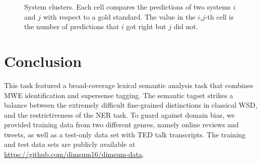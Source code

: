 \documentclass[11pt,letterpaper]{article}
\begin{document}
\begin{figure}
	\caption{System clusters. Each cell compares the predictions of two systems $i$ and $j$ with respect to a gold standard. The value in the $i$,$j$-th cell is the number of predictions that $i$ got right but $j$ did not.}
	\label{fig:system-clusters}
\end{figure}













\section{Conclusion}
This task featured a broad-coverage lexical semantic analysis task that combines MWE identification and supersense tagging. 
The semantic tagset strikes a balance between the extremely difficult fine-grained distinctions in classical WSD, 
and the restrictiveness of the NER task. To guard against domain bias, we provided training data 
from two different genres, namely online reviews and tweets, as well as a test-only data set with TED talk transcripts. 
The training and test data sets are publicly available at \url{https://github.com/dimsum16/dimsum-data}.
\end{document}
